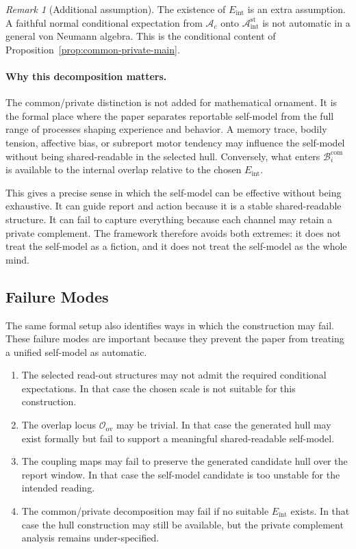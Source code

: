 \documentclass[12pt]{article}
\theoremstyle{definition}
\theoremstyle{remark}
\newtheorem{remark}[proposition]{Remark}
\newcommand{\Ac}{\mathcal A_c}
\newcommand{\Bint}{\mathcal A_{\mathrm{int}}^{\mathrm{st}}}
\begin{document}
\begin{remark}[Additional assumption]
The existence of \(E_{\mathrm{int}}\) is an extra assumption. A faithful
normal conditional expectation from \(\Ac\) onto \(\Bint\) is not
automatic in a general von Neumann algebra. This is the conditional
content of Proposition~\ref{prop:common-private-main}.
\end{remark}

\paragraph{Why this decomposition matters.}
The common/private distinction is not added for mathematical ornament.
It is the formal place where the paper separates reportable self-model
from the full range of processes shaping experience and behavior. A
memory trace, bodily tension, affective bias, or subreport motor
tendency may influence the self-model without being shared-readable in
the selected hull. Conversely, what enters
\(\mathcal B_i^{\mathrm{com}}\) is available to the internal overlap
relative to the chosen \(E_{\mathrm{int}}\).

This gives a precise sense in which the self-model can be effective
without being exhaustive. It can guide report and action because it is a
stable shared-readable structure. It can fail to capture everything
because each channel may retain a private complement. The framework
therefore avoids both extremes: it does not treat the self-model as a
fiction, and it does not treat the self-model as the whole mind.

\subsection{Failure Modes}

The same formal setup also identifies ways in which the construction may
fail. These failure modes are important because they prevent the paper
from treating a unified self-model as automatic.

\begin{enumerate}[label=(M\arabic*)]
\item The selected read-out structures may not admit the required
conditional expectations. In that case the chosen scale is not suitable
for this construction.
\item The overlap locus \(\mathcal O_{\mathrm{ov}}\) may be trivial. In
that case the generated hull may exist formally but fail to support a
meaningful shared-readable self-model.
\item The coupling maps may fail to preserve the generated candidate
hull over the report window. In that case the self-model candidate is
too unstable for the intended reading.
\item The common/private decomposition may fail if no suitable
\(E_{\mathrm{int}}\) exists. In that case the hull construction may
still be available, but the private complement analysis remains
under-specified.
\end{enumerate}
\end{document}
